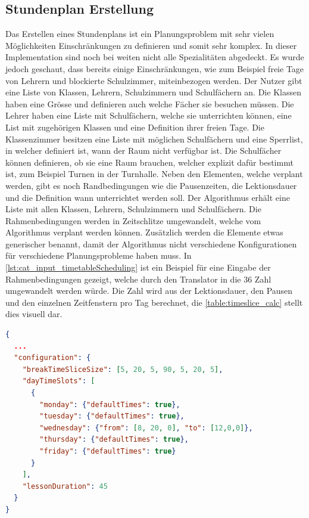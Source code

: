 \subsection{Stundenplan Erstellung}
Das Erstellen eines Stundenplans ist ein Planungsproblem mit sehr vielen Möglichkeiten Einschränkungen zu definieren und somit sehr komplex. In dieser Implementation sind noch bei weiten 
nicht alle Spezialitäten abgedeckt. Es wurde jedoch geschaut, dass bereits einige Einschränkungen, wie zum Beispiel freie Tage von Lehrern und blockierte Schulzimmer, miteinbezogen werden. 
Der Nutzer gibt eine Liste von Klassen, Lehrern, Schulzimmern und Schulfächern an. Die Klassen haben eine Grösse und definieren auch welche Fächer sie besuchen müssen. Die Lehrer haben 
eine Liste mit Schulfächern, welche sie unterrichten können, eine List mit zugehörigen Klassen und eine Definition ihrer freien Tage. Die Klassenzimmer besitzen eine Liste mit möglichen 
Schulfächern und eine Sperrlist, in welcher definiert ist, wann der Raum nicht verfügbar ist. Die Schulfächer können definieren, ob sie eine Raum brauchen, welcher explizit dafür 
bestimmt ist, zum Beispiel Turnen in der Turnhalle. Neben den Elementen, welche verplant werden, gibt es noch Randbedingungen wie die Pausenzeiten, die Lektionsdauer und die Definition 
wann unterrichtet werden soll. Der Algorithmus erhält eine Liste mit allen Klassen, Lehrern, Schulzimmern und Schulfächern. Die Rahmenbedingungen werden in Zeitschlitze umgewandelt, 
welche vom Algorithmus verplant werden können. Zusätzlich werden die Elemente etwas generischer benannt, damit der Algorithmus nicht verschiedene Konfigurationen für verschiedene 
Planungsprobleme haben muss. In \autoref{lst:cat_input_timetableScheduling} ist ein Beispiel für eine Eingabe der Rahmenbedingungen gezeigt, welche durch den Translator in die 36 Zahl 
umgewandelt werden würde. Die Zahl wird aus der Lektionsdauer, den Pausen und den einzelnen Zeitfenstern pro Tag berechnet, die \autoref{table:timeslice_calc} stellt dies visuell dar.

\begin{lstlisting}[language=JSON, caption=Ausschnitt einer Eingabe für das Stundenplanproblem für die Rahmenbedingungen, label=lst:cat_input_timetableScheduling]  
{
  ...
  "configuration": {
    "breakTimeSliceSize": [5, 20, 5, 90, 5, 20, 5],
    "dayTimeSlots": [
      {
        "monday": {"defaultTimes": true},
        "tuesday": {"defaultTimes": true},
        "wednesday": {"from": [8, 20, 0], "to": [12,0,0]},
        "thursday": {"defaultTimes": true},
        "friday": {"defaultTimes": true}
      }
    ],
    "lessonDuration": 45
  }
}
\end{lstlisting}


